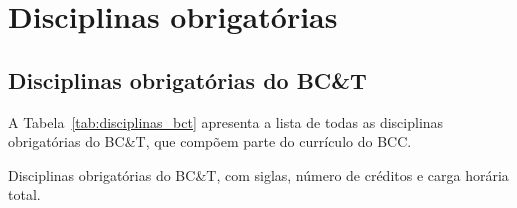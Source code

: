 \section{Disciplinas obrigatórias}
\label{sec:disciplinas_obrigatorias}

\subsection{Disciplinas obrigatórias do BC\&T}

A Tabela~\ref{tab:disciplinas_bct} apresenta a lista de todas as
disciplinas obrigatórias do BC\&T, que compõem parte do currículo do BCC.

\begin{table}[h!]
    \caption{Disciplinas obrigatórias do BC\&T, com siglas, número de créditos e carga horária total.}
    \label{tab:disciplinas_bct}


\end{table}

